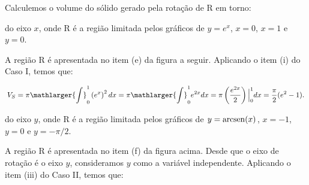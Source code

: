 \cleardoublepage\documentclass[../main.tex]{subfiles}
\begin{document}
\begin{ex}
Calculemos o volume do sólido gerado pela rotação de R em torno:
\begin{compactenum}[a)]
\item do eixo \(x\), onde R é a região limitada pelos gráficos de \(y=e^x\), \(x=0\), \(x=1\) e \( y=0\).

\begin{solution}
A região R é apresentada no item (e) da figura a seguir. Aplicando o item (i) do Caso I, temos que:

\[ V_S= \pi \mathlarger{\int}^{1}_{0}\left( e^x\right)^2dx = \pi \mathlarger{\int}^{1}_{0} e^{2x} dx = \pi \left( \dfrac{e^{2x}}{2}\right) \Big{|}^{1}_{0} dx = \dfrac{\pi}{2} (e^2-1). \]

\begin{figure}[H]
\centering
{}\qquad
{}
\end{figure}
\end{solution}
\item do eixo \(y\), onde R é a região limitada pelos gráficos de \(y={\rm arcsen}(x)\), \( x=-1\), \(y=0\) e \( y=-\pi/2\).

\begin{solution}
A região R é apresentada no item (f) da figura acima. Desde que o eixo de rotação é o eixo \(y\), consideramos \(y\) como a variável independente. Aplicando o item (iii) do Caso II, temos que:


\end{solution}
\end{compactenum}
\end{ex}
\end{document}
